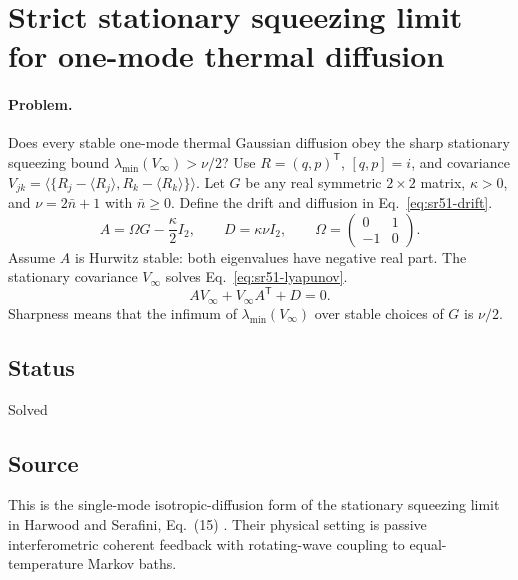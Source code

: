 \section{Strict stationary squeezing limit for one-mode thermal diffusion}
\label{sec:op_71f84253f425fc7e}

\paragraph{Problem.}
Does every stable one-mode thermal Gaussian diffusion obey the sharp stationary squeezing bound $\lambda_{\min}(V_\infty)>\nu/2$?
Use $R=(q,p)^{\mathsf T}$, $[q,p]=i$, and covariance $V_{jk}=\langle\{R_j-\langle R_j\rangle,R_k-\langle R_k\rangle\}\rangle$.
Let $G$ be any real symmetric $2\times2$ matrix, $\kappa>0$, and $\nu=2\bar n+1$ with $\bar n\geq0$.
Define the drift and diffusion in Eq.~\eqref{eq:sr51-drift}.
\begin{equation}
A=\Omega G-\frac\kappa2I_2,\qquad D=\kappa\nu I_2,\qquad \Omega=\begin{pmatrix}0&1\\-1&0\end{pmatrix}.
\label{eq:sr51-drift}
\end{equation}
Assume $A$ is Hurwitz stable: both eigenvalues have negative real part.
The stationary covariance $V_\infty$ solves Eq.~\eqref{eq:sr51-lyapunov}.
\begin{equation}
AV_\infty+V_\infty A^{\mathsf T}+D=0.
\label{eq:sr51-lyapunov}
\end{equation}
Sharpness means that the infimum of $\lambda_{\min}(V_\infty)$ over stable choices of $G$ is $\nu/2$.

\subsection*{Status}

Solved

\subsection*{Source}

This is the single-mode isotropic-diffusion form of the stationary squeezing limit in Harwood and Serafini, Eq.~(15) . Their physical setting is passive interferometric coherent feedback with rotating-wave coupling to equal-temperature Markov baths.

